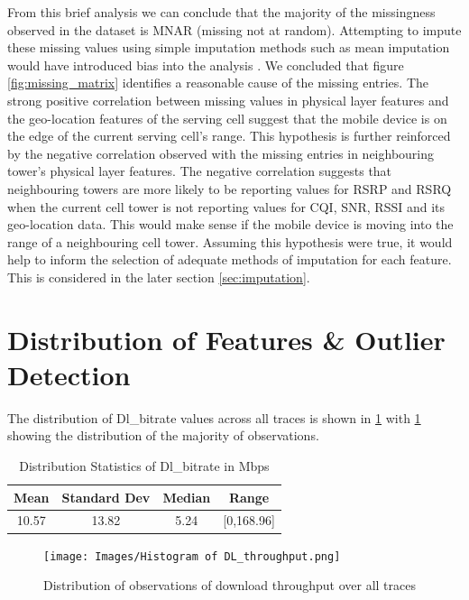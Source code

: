 From this brief analysis we can conclude that the majority of the missingness observed in the dataset is MNAR (missing not at random). Attempting to impute these missing values using simple imputation methods such as mean imputation would have introduced bias into the analysis \cite{DONDERS20061087}. We concluded that figure \ref{fig:missing_matrix} identifies a reasonable cause of the missing entries. The strong positive correlation between missing values in physical layer features and the geo-location features of the serving cell suggest that the mobile device is on the edge of the current serving cell's range. This hypothesis is further reinforced by the negative correlation observed with the missing entries in neighbouring tower's physical layer features. The negative correlation suggests that neighbouring towers are more likely to be reporting values for RSRP and RSRQ when the current cell tower is not reporting values for CQI, SNR, RSSI and its geo-location data. This would make sense if the mobile device is moving into the range of a neighbouring cell tower. Assuming this hypothesis were true, it would help to inform the selection of adequate methods of imputation for each feature. This is considered in the later section \ref{sec:imputation}.

\section{Distribution of Features \& Outlier Detection}
\label{sec:dist_of_features}
The distribution of Dl\_bitrate values across all traces is shown in \ref{tab:dl_dist} with \ref{fig:dl_hist} showing the distribution of the majority of observations.

\begin{table}[!htb]
  \centering
  \caption{Distribution Statistics of Dl\_bitrate in Mbps}
  \begin{tabular}{|c|c|c|c|}
    \hline
    Mean & Standard Dev & Median & Range \\
    \hline
   10.57 & 13.82 & 5.24 & [0,168.96] \\
    \hline
  \end{tabular}
  \label{tab:dl_dist}
\end{table}

\begin{figure}[H]
\texttt{[image: Images/Histogram of DL\_throughput.png]}
\centering
\caption{Distribution of observations of download throughput over all traces}
\label{fig:dl_hist}
\end{figure}


